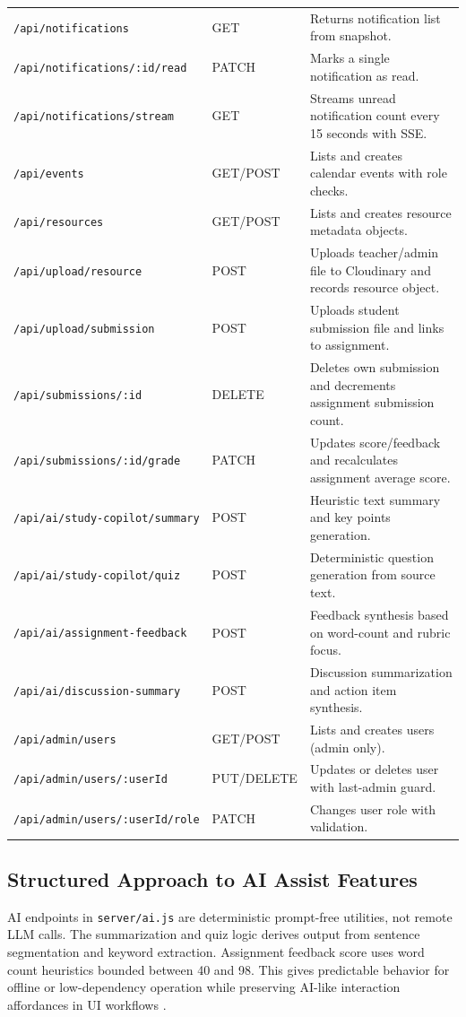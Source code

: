 \begin{longtable}{>{\raggedright\arraybackslash}p{2.4cm} >{\raggedright\arraybackslash}p{1.7cm} >{\raggedright\arraybackslash}p{7.8cm}}
\texttt{/api/notifications} & GET & Returns notification list from snapshot. \\
\texttt{/api/notifications/:id/read} & PATCH & Marks a single notification as read. \\
\texttt{/api/notifications/stream} & GET & Streams unread notification count every 15 seconds with SSE. \\
\texttt{/api/events} & GET/POST & Lists and creates calendar events with role checks. \\
\texttt{/api/resources} & GET/POST & Lists and creates resource metadata objects. \\
\texttt{/api/upload/resource} & POST & Uploads teacher/admin file to Cloudinary and records resource object. \\
\texttt{/api/upload/submission} & POST & Uploads student submission file and links to assignment. \\
\texttt{/api/submissions/:id} & DELETE & Deletes own submission and decrements assignment submission count. \\
\texttt{/api/submissions/:id/grade} & PATCH & Updates score/feedback and recalculates assignment average score. \\
\texttt{/api/ai/study-copilot/summary} & POST & Heuristic text summary and key points generation. \\
\texttt{/api/ai/study-copilot/quiz} & POST & Deterministic question generation from source text. \\
\texttt{/api/ai/assignment-feedback} & POST & Feedback synthesis based on word-count and rubric focus. \\
\texttt{/api/ai/discussion-summary} & POST & Discussion summarization and action item synthesis. \\
\texttt{/api/admin/users} & GET/POST & Lists and creates users (admin only). \\
\texttt{/api/admin/users/:userId} & PUT/DELETE & Updates or deletes user with last-admin guard. \\
\texttt{/api/admin/users/:userId/role} & PATCH & Changes user role with validation. \\
\bottomrule
\end{longtable}

\subsection{Structured Approach to AI Assist Features}

AI endpoints in \texttt{server/ai.js} are deterministic prompt-free utilities, not remote LLM calls. The summarization and quiz logic derives output from sentence segmentation and keyword extraction. Assignment feedback score uses word count heuristics bounded between 40 and 98. This gives predictable behavior for offline or low-dependency operation while preserving AI-like interaction affordances in UI workflows \cite{repo-server-modules}.

